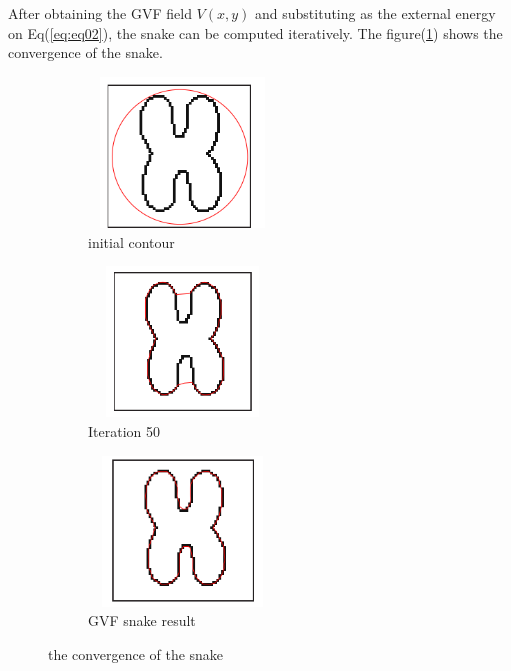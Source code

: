 After obtaining the GVF field $V(x, y)$ and substituting as the external energy on
Eq(\ref{eq:eq02}), the snake can be computed iteratively. The figure(\ref{fig:figure5}) shows the
convergence of the snake.
\begin{figure}[ht!]
        \centering
        \begin{subfigure}[b]{0.3\textwidth}
                \centering
                \includegraphics[width=5cm,height=4cm]{chapiter2/figures/FG01.png}
                \caption{initial contour}
        \end{subfigure}
        \hfill
        \begin{subfigure}[b]{0.3\textwidth}
                \centering
                \includegraphics[width=5cm,height=4cm]{chapiter2/figures/FG02.png}
                \caption{Iteration 50}
        \end{subfigure}
        \hfill
        \begin{subfigure}[b]{0.3\textwidth}
                \centering
                \includegraphics[width=5cm,height=4cm]{chapiter2/figures/FG03.png}
                \caption{GVF snake result}
        \end{subfigure}
        \caption{the convergence of the snake}
        \label{fig:figure5}
\end{figure}

